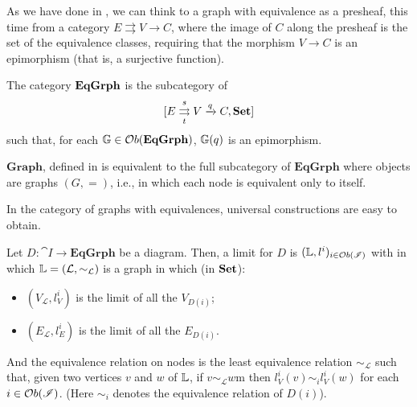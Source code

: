 As we have done in , we can think to a graph with equivalence as a presheaf, this time from a category $E \rightrightarrows V \rightarrow C$, where the image of $C$ along the presheaf is the set of the equivalence classes, requiring that the morphism $V\rightarrow C$ is an epimorphism (that is, a surjective function).



\begin{definition}
    The category $\mathbf{EqGrph}$ is the subcategory of $$[E \mathrel{\mathop{\rightrightarrows}^{s}_{t}} V \xrightarrow{q} C, \mathbf{Set}]$$ such that, for each $\mathbb{G} \in \mathcal{O}b(\mathbf{EqGrph})$, $\mathbb{G}(q)$ is an epimorphism. 
\end{definition}

\begin{obs}
    $\mathbf{Graph}$, defined in  is equivalent to the full subcategory of $\mathbf{EqGrph}$ where objects are graphs $(G, =)$, i.e., in which each node is equivalent only to itself.
\end{obs}


In the category of graphs with equivalences, universal constructions are easy to obtain. 
\begin{prop}\label{prop:limits_in_EqGrph}
    Let $D: \cat I \rightarrow \mathbf{EqGrph}$ be a diagram. Then, a limit for $D$ is $(\mathbb{L}, l^i)_{i\in \mathcal{O}b(\mathscr{I})}$ with in which $\mathbb{L} = (\mathcal{L}, \sim_{\mathcal{L}})$ is a graph in which (in $\mathbf{Set}$):
    \begin{itemize}
        \item $(V_{\mathcal{L}}, l^i_{V})$ is the limit of all the $V_{D(i)}$;
        \item $(E_{\mathcal{L}}, l^i_{E})$ is the limit of all the $E_{D(i)}$.
    \end{itemize}
    And the equivalence relation on nodes is the least equivalence relation $\sim_{\mathcal{L}}$ such that, given two vertices $v$ and $w$ of $\mathbb{L}$, if $v\sim_{\mathcal{L}}w$m then $l^i_V(v) \sim_i l^i_V(w)$ for each $i\in \mathcal{O}b(\mathscr{I})$. (Here $\sim_i$ denotes the equivalence relation of $D(i)$).
\end{prop}

